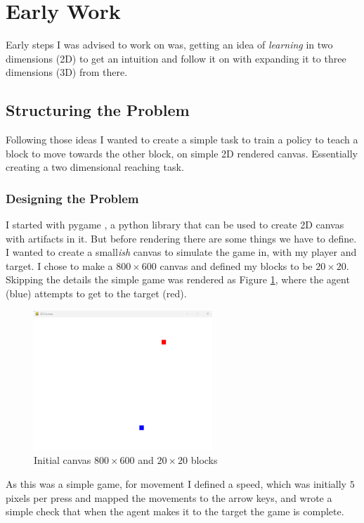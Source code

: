 \section{Early Work}
Early steps I was advised to work on was, getting an idea of \emph{learning} in two dimensions (2D) to get an intuition and follow it on with expanding it to three dimensions (3D) from there.

\subsection{Structuring the Problem}
Following those ideas I wanted to create a simple task to train a policy to teach a block to move towards the other block, on simple 2D rendered canvas. Essentially creating a two dimensional reaching task.

\subsubsection{Designing the Problem} 
I started with pygame \cite{pygame}, a python library that can be used to create 2D canvas with artifacts in it. But before rendering there are some things we have to define. I wanted to create a small\emph{ish} canvas to simulate the game in, with my player and target. I chose to make a $800 \times 600$ canvas and defined my blocks to be $20 \times 20$. Skipping the details the simple game was rendered as Figure \ref{fig:initial-canvas}, where the agent (blue) attempts to get to the target (red).

\begin{figure}[h]
  \centering
  \includegraphics[width=0.6\textwidth]{assets/early-work/initial-canvas.png}
  \caption{Initial canvas $800 \times 600$ and $20 \times 20$ blocks}\label{fig:initial-canvas}
\end{figure}

As this was a simple game, for movement I defined a speed, which was initially $5$ pixels per press and mapped the movements to the arrow keys, and wrote a simple check that when the agent makes it to the target the game is complete.

